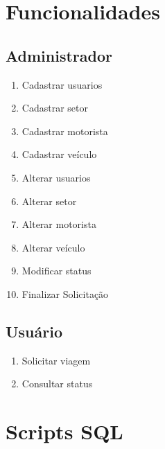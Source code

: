 \documentclass[11pt]{article}
\begin{document}
\section{Funcionalidades}
\subsection{Administrador}
\begin{enumerate}
\item Cadastrar usuarios
\item Cadastrar setor
\item Cadastrar motorista
\item Cadastrar veículo
\item Alterar usuarios
\item Alterar setor
\item Alterar motorista
\item Alterar veículo
\item Modificar status
\item Finalizar Solicitação
\end{enumerate}

\subsection{Usuário}
\begin{enumerate}
\item Solicitar viagem
\item Consultar status
\end{enumerate}

\section{Scripts SQL}
\end{document}

